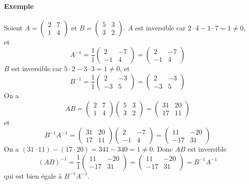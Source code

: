 \paragraph{Exemple} Soient $A = \begin{pmatrix} 2 & 7 \\ 1 & 4 \end{pmatrix}$ et $B = \begin{pmatrix} 5 & 3 \\ 3 & 2 \end{pmatrix}$.
$A$ est inversible car $2 \cdot 4 - 1 \cdot 7 = 1 \neq 0$, et
$$A^{-1} = \frac{1}{1} \begin{pmatrix} 2 & -7 \\ -1 & 4 \end{pmatrix} = \begin{pmatrix} 2 & -7 \\ -1 & 4 \end{pmatrix}$$
$B$ est inversible car $5 \cdot 2 - 3 \cdot 3 = 1 \neq 0$, et 
$$B^{-1} = \frac{1}{1} \begin{pmatrix} 2 & -3 \\ -3 & 5 \end{pmatrix} = \begin{pmatrix} 2 & -3\\ -3 & 5 \end{pmatrix}$$
On a 
$$A B = \begin{pmatrix} 2 & 7 \\ 1 & 4 \end{pmatrix} 
  \begin{pmatrix}5&3\\3&2\end{pmatrix}
  = \begin{pmatrix} 31 & 20 \\ 17 & 11 \end{pmatrix}$$
et
$$B^{-1} A^{-1} = \begin{pmatrix} 31 & 20 \\ 17 & 11 \end{pmatrix} 
  \begin{pmatrix} 2 & -7 \\ -1 & 4 \end{pmatrix} 
  = \begin{pmatrix} 11 & -20 \\ -17 & 31 \end{pmatrix}$$
On a $(31 \cdot 11) - (17 \cdot 20) = 341 - 340 = 1 \neq 0$. Donc $A B$ est inversible 
$$(AB)^{-1} = \frac{1}{1} \begin{pmatrix} 11 & -20 \\ -17 & 31 \end{pmatrix} 
  = \begin{pmatrix} 11 & -20 \\ -17 & 31 \end{pmatrix} = B^{-1} A^{-1}$$
qui est bien égale à $B^{-1} A^{-1}$.

